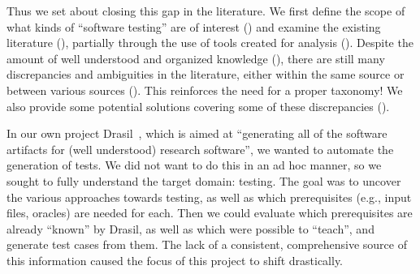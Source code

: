 Thus we set about closing this gap in the literature. We first define the scope
of what kinds of
``software testing'' are of interest () and examine the existing
literature ()\ifnotpaper, partially through the use of tools
created for analysis ()\fi. Despite the amount of well understood
and organized knowledge (), there are still many discrepancies and
ambiguities in the literature, either within the same source or between various
sources (). This reinforces the need for a proper taxonomy! We
also provide some potential solutions covering some of these discrepancies
().

\ifnotpaper
    In our own project Drasil~\citep{Drasil}, which is aimed at ``generating
    all of the software artifacts for (well understood) research software'', we
    wanted to automate the generation of tests. We did not want to do this
    in an ad hoc manner, so we sought to fully understand the target domain:
    testing. The goal was to uncover the various approaches towards testing, as
    well as which prerequisites (e.g., input files, oracles) are needed for
    each. Then we could evaluate which prerequisites are already ``known'' by
    Drasil, as well as which were possible to ``teach'', and generate test
    cases from them. The lack of a consistent, comprehensive source of this
    information caused the focus of this project to shift drastically.
\fi